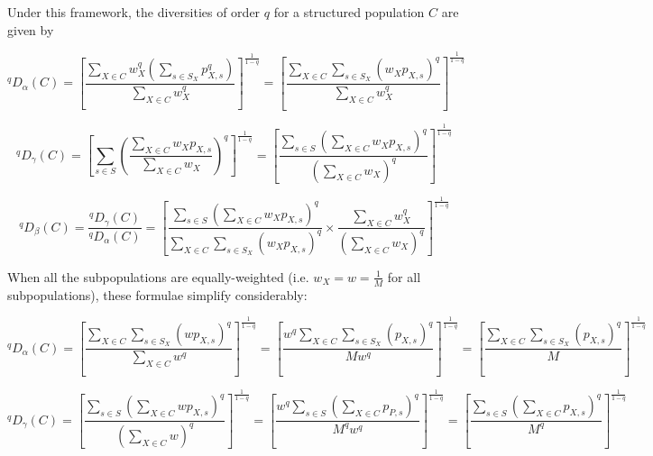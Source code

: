 Under this framework, the diversities of order $q$ for a structured population $C$ are given by

\begin{equation}
^qD_\alpha(C)
= \left[\frac{\displaystyle\sum_{X \in C} w_X^q \left(\sum_{s \in S_X} p_{X,s}^q\right)}{\displaystyle\sum_{X \in C} w_X^q}\right]^\frac{1}{1-q}
= \left[\frac{\displaystyle\sum_{X \in C}\sum_{s \in S_X} (w_Xp_{X,s})^q}{\displaystyle\sum_{X \in C} w_X^q}\right]^\frac{1}{1-q}
\label{eq:diversity_alpha}
\end{equation}

\begin{equation}
^qD_\gamma(C)
= \left[\sum_{s \in S} \left(\frac{\displaystyle\sum_{X \in C} w_Xp_{X,s}}{\displaystyle\sum_{X \in C} w_X}\right)^q\right]^\frac{1}{1-q}
= \left[\frac{\displaystyle\sum_{s \in S}\left(\sum_{X \in C} w_Xp_{X,s}\right)^q}{\displaystyle\left(\sum_{X \in C} w_X\right)^q}\right]^\frac{1}{1-q}
\label{eq:diversity_gamma}
\end{equation}

\begin{equation}
^qD_\beta(C) = \frac{^qD_\gamma(C)}{^qD_\alpha(C)}
= \left[
\frac{\displaystyle\sum_{s \in S}\left(\sum_{X \in C} w_Xp_{X,s}\right)^q}
{\displaystyle\sum_{X \in C}\sum_{s \in S_X} (w_Xp_{X,s})^q}
\times
\frac{\displaystyle\sum_{X \in C} w_X^q}
{\displaystyle\left(\sum_{X \in C} w_X\right)^q}
\right]^\frac{1}{1-q}
\label{eq:diversity_beta}
\end{equation}

When all the subpopulations are equally-weighted (i.e. $w_X = w = \frac{1}{M}$ for all subpopulations), these formulae simplify considerably:

\begin{equation}
^qD_\alpha(C)
= \left[\frac{\displaystyle\sum_{X \in C}\sum_{s \in S_X} (wp_{X,s})^q}{\displaystyle\sum_{X \in C} w^q}\right]^\frac{1}{1-q}
= \left[\frac{\displaystyle w^q\sum_{X \in C}\sum_{s \in S_X} (p_{X,s})^q}{\displaystyle M w^q}\right]^\frac{1}{1-q}
= \left[\frac{\displaystyle \sum_{X \in C}\sum_{s \in S_X} (p_{X,s})^q}{\displaystyle M}\right]^\frac{1}{1-q}
\label{eq:diversity_alpha_even}
\end{equation}

\begin{equation}
^qD_\gamma(C)
= \left[\frac{\displaystyle\sum_{s \in S}\left(\sum_{X \in C} wp_{X,s}\right)^q}{\displaystyle\left(\sum_{X \in C} w\right)^q}\right]^\frac{1}{1-q}
= \left[\frac{\displaystyle w^q\sum_{s \in S}\left(\sum_{X \in C} p_{P,s}\right)^q}{\displaystyle M^qw^q}\right]^\frac{1}{1-q}
= \left[\frac{\displaystyle\sum_{s \in S}\left(\sum_{X \in C} p_{X,s}\right)^q}{\displaystyle M^q}\right]^\frac{1}{1-q}
\label{eq:diversity_gamma_even}
\end{equation}

